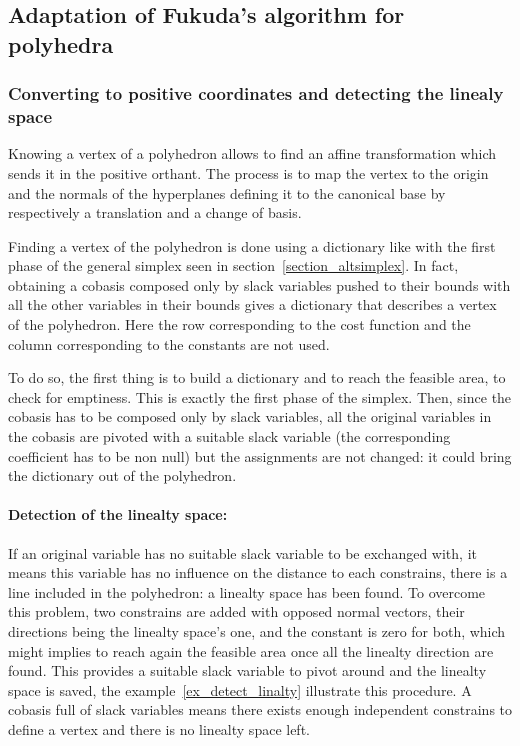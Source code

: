 \subsection{Adaptation of Fukuda's algorithm for polyhedra}

\subsubsection{Converting to positive coordinates and detecting the linealy space}

Knowing a vertex of a polyhedron allows to find an affine transformation which sends it in the positive orthant. The process is to map the vertex to the origin and the normals of the hyperplanes defining it to the canonical base by respectively a translation and a change of basis.

Finding a vertex of the polyhedron is done using a dictionary like with the first phase of the general simplex seen in section~\ref{section_altsimplex}. In fact, obtaining a cobasis composed only by slack variables pushed to their bounds with all the other variables in their bounds gives a dictionary that describes a vertex of the polyhedron. Here the row corresponding to the cost function and the column corresponding to the constants are not used.


To do so, the first thing is to build a dictionary and to reach the feasible area, to check for emptiness. This is exactly the first phase of the simplex. Then, since the cobasis has to be composed only by slack variables, all the original variables in the cobasis are pivoted with a suitable slack variable (the corresponding coefficient has to be non null) but the assignments are not changed: it could bring the dictionary out of the polyhedron. 
\paragraph*{Detection of the linealty space:} If an original variable has no suitable slack variable to be exchanged with, it means this variable has no influence on the distance to each constrains, there is a line included in the polyhedron: a linealty space has been found. To overcome this problem, two constrains are added with opposed normal vectors, their directions being the linealty space's one, and the constant is zero for both, which might implies to reach again the feasible area once all the linealty direction are found. This provides a suitable slack variable to pivot around and the linealty space is saved, the example~\ref{ex_detect_linalty} illustrate this procedure. A cobasis full of slack variables means there exists enough independent constrains to define a vertex and there is no linealty space left.

